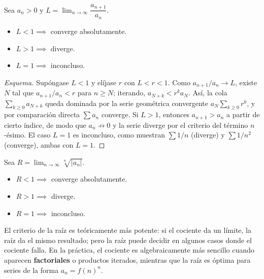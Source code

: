 \begin{theorem}
Sea $a_n > 0$ y $L = \displaystyle\lim_{n\to\infty}\dfrac{a_{n+1}}{a_n}$.
\begin{itemize}
  \item $L < 1 \implies$ converge absolutamente.
  \item $L > 1 \implies$ diverge.
  \item $L = 1 \implies$ inconcluso.
\end{itemize}
\end{theorem}

\begin{proof}[Esquema]
Supóngase $L<1$ y elíjase $r$ con $L<r<1$. Como $a_{n+1}/a_n\to L$, existe $N$
tal que $a_{n+1}/a_n<r$ para $n\geq N$; iterando, $a_{N+k}<r^k a_N$. Así, la
cola $\sum_{k\geq 0}a_{N+k}$ queda dominada por la serie geométrica convergente
$a_N\sum_{k\geq 0} r^k$, y por comparación directa $\sum a_n$ converge. Si
$L>1$, entonces $a_{n+1}>a_n$ a partir de cierto índice, de modo que $a_n\not\to
0$ y la serie diverge por el criterio del término $n$-ésimo. El caso $L=1$ es
inconcluso, como muestran $\sum 1/n$ (diverge) y $\sum 1/n^2$ (converge), ambas
con $L=1$.
\end{proof}

\begin{theorem}
Sea $R = \displaystyle\lim_{n\to\infty}\sqrt[n]{|a_n|}$.
\begin{itemize}
  \item $R < 1 \implies$ converge absolutamente.
  \item $R > 1 \implies$ diverge.
  \item $R = 1 \implies$ inconcluso.
\end{itemize}
\end{theorem}

\begin{rem}
El criterio de la raíz es teóricamente más potente: si el cociente da un
límite, la raíz da el mismo resultado; pero la raíz puede decidir en
algunos casos donde el cociente falla. En la práctica, el cociente es
algebraicamente más sencillo cuando aparecen \textbf{factoriales} o
productos iterados, mientras que la raíz es óptima para series de la
forma $a_n = f(n)^n$.
\end{rem}

